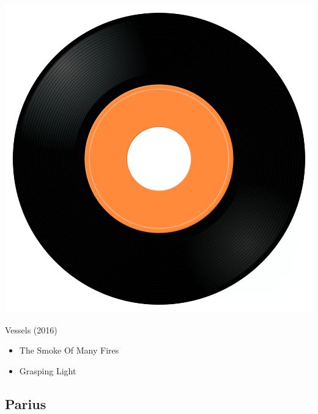 \begin{minipage}[t]{0.25\textwidth}\vspace{0pt}
\captionsetup{type=figure}
\includegraphics[width=\textwidth]{Images/cover.png}
\caption*{Vessels (2016)}
\end{minipage}
\begin{minipage}[t]{0.25\textwidth}\vspace{0pt}
\begin{itemize}[nosep,leftmargin=1em,labelwidth=*,align=left]
	\setlength{\itemsep}{0pt}
	\item The Smoke Of Many Fires
	\item Grasping Light
\end{itemize}
\end{minipage}

\subsection{Parius}

